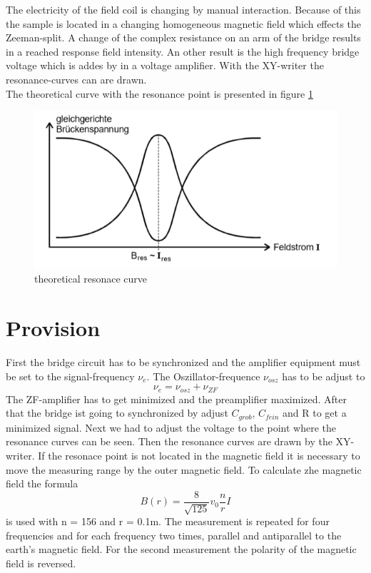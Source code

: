 The electricity of the field coil is changing by manual interaction.
Because of this the sample is located in a changing homogeneous magnetic field which effects the Zeeman-split.
A change of the complex resistance on an arm of the bridge results in a reached response field intensity.
An other result is the high frequency bridge voltage which is addes by in a voltage amplifier.
With the XY-writer the resonance-curves can are drawn.\\
The theoretical curve with the resonance point is presented in figure \ref{fig:resonanz}
\begin{figure}[H]
  \centering
  \includegraphics[scale=0.6]{pictures/7.png}
  \caption{theoretical resonace curve \cite{anleitung}}
  \label{fig:resonanz}
\end{figure}
\section{Provision}

First the bridge circuit has to be synchronized and the amplifier equipment must be set to the signal-frequency $\nu_e$.
The Oszillator-frequence $\nu_{osz}$ has to be adjust to
\begin{equation*}
  \nu_e = \nu_{osz} +\nu_{ZF}
\end{equation*}
The ZF-amplifier has to get minimized and the preamplifier maximized.
After that the bridge ist going to synchronized by adjust $C_{grob}$, $C_{fein}$ and R to get a minimized signal.
Next we had to adjust the voltage to the point where the resonance curves can be seen.
Then the resonance curves are drawn by the XY-writer.
If the resonace point is not located in the magnetic field it is necessary to move the measuring range by the outer magnetic field.
To calculate zhe magnetic field the formula
\begin{equation}
  B(r) =\frac{8}{\sqrt{125}}v_0\frac{n}{r}I
  \label{eqn:1}
\end{equation}
is used with n = 156 and r = 0.1m.
The measurement is repeated for four frequencies and for each frequency two times,
parallel and antiparallel to the earth's magnetic field.
For the second measurement the polarity of the magnetic field is reversed.
